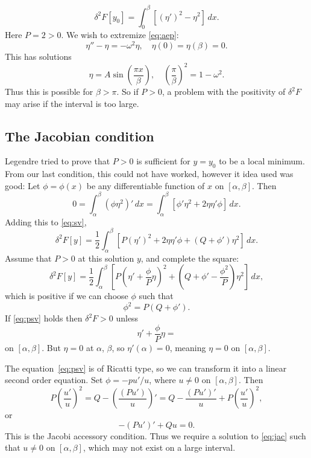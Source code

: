 \documentclass[12pt]{article}
\theoremstyle{definition}
\theoremstyle{remark}
\begin{document}
\begin{adjustbox}{minipage = \columnwidth - 25.5pt, margin=1em, frame=1pt, margin=0em}
	\[
		\delta^2 F[y_0] = \int_{0}^{\beta} [(\eta')^2 - \eta^2]\, dx
	.\]
	Here $P = 2 > 0$. We wish to extremize \eqref{eq:aep}:
	\[
		\eta'' - \eta = -\omega^2\eta, \quad \eta(0) = \eta(\beta) = 0
	.\]
	This has solutions
	\[
		\eta = A \sin \left( \frac{\pi x}{\beta} \right), \quad \left( \frac{\pi}{\beta}\right)^2 = 1 - \omega^2
	.\]
	Thus this is possible for $\beta > \pi$. So if $P > 0$, a problem with the positivity of $\delta^2 F$ may arise if the interval is too large.

\end{adjustbox}

\subsection{The Jacobian condition}%
\label{sub:the_jacobian_condition}

Legendre tried to prove that $P > 0$ is sufficient for $y = y_0$ to be a local minimum. From our last condition, this could not have worked, however it idea used was good: Let $\phi = \phi(x)$ be any differentiable function of $x$ on $[\alpha, \beta]$. Then
\[
	0 = \int_{\alpha}^{\beta}(\phi \eta^2)'\, dx = \int_{\alpha}^{\beta} [\phi' \eta^2 + 2 \eta \eta' \phi]\, dx
.\]
Adding this to \eqref{eq:sv},
\[
	\delta^2F[y] = \frac{1}{2} \int_{\alpha}^{\beta} [P(\eta')^2 + 2 \eta \eta' \phi + (Q + \phi') \eta^2]\, dx
.\]
Assume that $P > 0$ at this solution $y$, and complete the square:
\[
	\delta^2F[y] = \frac{1}{2} \int_{\alpha}^{\beta} \left[ P \left( \eta' + \frac{\phi}{P} \eta \right)^2 + \left(Q + \phi' - \frac{\phi^2}{P}\right)\eta^2 \right]\,dx
,\]
which is positive if we can choose $\phi$ such that
\[
	\phi^2 = P(Q + \phi') \tag{8.3}\label{eq:psv}
.\]
If \eqref{eq:psv} holds then $\delta^2 F > 0$ unless
\[
\eta' + \frac{\phi}{P}\eta =
\]
on $[\alpha, \beta]$. But $\eta = 0$ at $\alpha$, $\beta$, so $\eta'(\alpha) = 0$, meaning $\eta = 0$ on $[\alpha, \beta]$.

The equation~\eqref{eq:psv} is of Ricatti type, so we can transform it into a linear second order equation. Set $\phi = -pu'/u$, where $u \neq 0$ on $[\alpha, \beta]$. Then
\[
	P \left(\frac{u'}{u}\right)^2 = Q - \left( \frac{(Pu')}{u} \right)' = Q - \frac{(Pu')'}{u} + P\left(\frac{u'}{u}\right)^2
,\]
or
\[
	-(Pu')' + Qu = 0 \tag{8.4}\label{eq:jac}
.\]
This is the Jacobi accessory condition. Thus we require a solution to \eqref{eq:jac} such that $u \neq 0$ on $[\alpha, \beta]$, which may not exist on a large interval.
\end{document}

